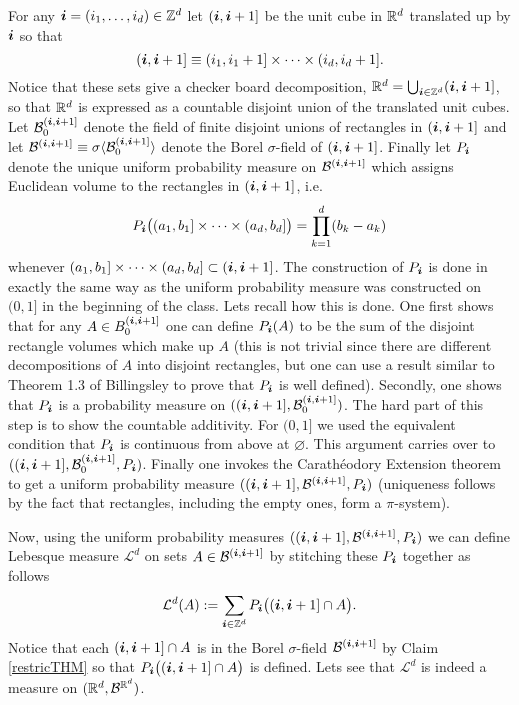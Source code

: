 For any $\boldsymbol i=(i_1,\ldots, i_d)\in\Bbb Z^d$ let $(\boldsymbol i,\boldsymbol i+1]$ be the unit cube in $\Bbb R^d$ translated up by $\boldsymbol i$ so that
\[(\boldsymbol i,\boldsymbol i+1] \equiv (i_1, i_1+1]\times \cdots \times (i_d,i_d + 1].  \]
Notice that these sets give a checker board decomposition, $\Bbb R^d=\bigcup_{\boldsymbol i\in\Bbb Z^d} (\boldsymbol i,\boldsymbol i+1] $, so that $\Bbb R^d$ is expressed as a countable disjoint union of the translated unit cubes. Let $\mathcal B_{0}^{(\boldsymbol i,\boldsymbol i+1] }$ denote the field of finite disjoint unions of rectangles in $(\boldsymbol i,\boldsymbol i+1] $ and let $\mathcal B^{(\boldsymbol i,\boldsymbol i+1] }\equiv \sigma \langle \mathcal B_{0}^{(\boldsymbol i,\boldsymbol i+1] }\rangle $ denote the Borel $\sigma$-field of  $(\boldsymbol i,\boldsymbol i+1]$. Finally let $P_{\boldsymbol i}$ denote the unique uniform probability measure on $\mathcal B^{(\boldsymbol i,\boldsymbol i+1] }$ which assigns Euclidean volume  to the rectangles in  $(\boldsymbol i,\boldsymbol i+1] $, i.e.
\[ P_{\boldsymbol i}\bigl( (a_1,b_1]\times \cdots \times (a_d,b_d]\bigr)=\prod_{k=1}^d (b_k - a_k) \]
whenever $(a_1,b_1]\times \cdots \times (a_d,b_d]\subset (\boldsymbol i,\boldsymbol i+1]$. The construction of $P_{\boldsymbol i}$ is done in exactly the same way as the uniform probability measure was constructed on $(0,1]$ in the beginning of the class. Lets recall how this is done. One first shows that for any $A\in \mathcal \mathcal B_{0}^{(\boldsymbol i,\boldsymbol i+1] }$ one can define $P_{\boldsymbol i}(A)$ to be the sum  of the disjoint rectangle volumes which make up $A$ (this is not trivial since there are different decompositions of $A$ into disjoint rectangles, but one can use a result similar to Theorem 1.3 of Billingsley to prove that $P_{\boldsymbol i}$ is well defined).  Secondly, one shows that $P_{\boldsymbol i}$ is a probability measure on $((\boldsymbol i, \boldsymbol i +1],\mathcal B_{0}^{(\boldsymbol i,\boldsymbol i+1] })$. The hard part of this step is to  show the countable additivity. For $(0,1]$ we used the equivalent condition that  $P_{\boldsymbol i}$ is continuous from above at $\varnothing$. This argument carries over to $((\boldsymbol i, \boldsymbol i +1],\mathcal B_{0}^{(\boldsymbol i,\boldsymbol i+1] }, P_{\boldsymbol i})$. Finally one invokes the Carath\'eodory Extension theorem to get a uniform probability measure $((\boldsymbol i, \boldsymbol i +1],\mathcal B^{(\boldsymbol i,\boldsymbol i+1] }, P_{\boldsymbol i})$ (uniqueness follows by the fact that rectangles, including the empty ones, form a $\pi$-system).

Now, using the uniform probability measures $((\boldsymbol i, \boldsymbol i +1],\mathcal B^{(\boldsymbol i,\boldsymbol i+1] }, P_{\boldsymbol i})$ we can define Lebesque measure $\mathcal L^d$ on sets $A\in\mathcal B^{(\boldsymbol i,\boldsymbol i+1] }$ by stitching these $P_{\boldsymbol i}$ together as follows
\begin{equation}
\label{Lm}
 \mathcal L^d(A):= \sum_{\boldsymbol i\in\Bbb Z^d} P_{\boldsymbol i}\bigl( (\boldsymbol i, \boldsymbol i+1]\cap A\bigr).
 \end{equation}
Notice that each $ (\boldsymbol i, \boldsymbol i+1]\cap A$ is in the Borel $\sigma$-field $\mathcal B^{(\boldsymbol i,\boldsymbol i+1] }$ by Claim \ref{restricTHM} so that
$P_{\boldsymbol i}\bigl( (\boldsymbol i, \boldsymbol i+1]\cap A\bigr)$ is defined.
Lets see that $\mathcal L^d$ is indeed a measure on $(\Bbb R^d,\mathcal B^{\Bbb R^d })$.


